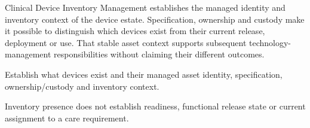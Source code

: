 Clinical Device Inventory Management establishes the managed identity and inventory context of the device estate. Specification, ownership and custody make it possible to distinguish which devices exist from their current release, deployment or use. That stable asset context supports subsequent technology-management responsibilities without claiming their different outcomes.



Establish what devices exist and their managed asset identity, specification, ownership/\allowbreak{}custody and inventory context.



Inventory presence does not establish readiness, functional release state or current assignment to a care requirement.


